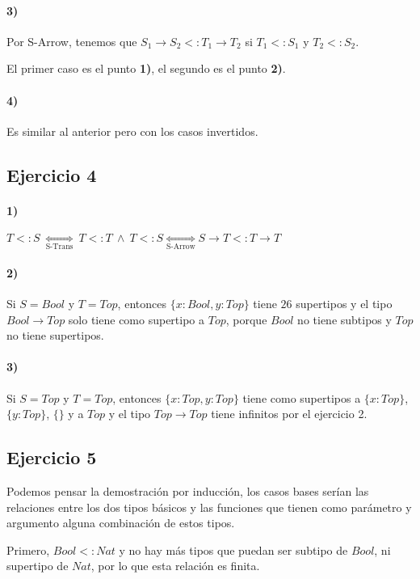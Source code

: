 \documentclass[10pt,a4paper, landscape]{article}
\begin{document}
\begin{multicols}{2}
		\paragraph{3)} Por S-Arrow, tenemos que $S_1\to S_2 <: T_1\to T_2$ si $T_1 <: S_1$ y $T_2 <: S_2$. 
		
		El primer caso es el punto \textbf{1)}, el segundo es el punto \textbf{2)}.
		\paragraph{4)} Es similar al anterior pero con los casos invertidos.
		\vfill\null
\end{multicols}

\newpage
\begin{multicols}{2}
		\subsection{Ejercicio 4}
		\paragraph{1)} $T<:S~\underset{\text{S-Trans}}{\iff} ~ T<:T~\land~T<:S \underset{\text{S-Arrow}}{\iff} S\to T <: T\to T$
		\paragraph{2)} Si $S = Bool$ y $T = Top$, entonces $\{x:Bool, y:Top\}$ tiene $26$ supertipos y el tipo $Bool\to Top$ solo tiene como supertipo a $Top$, porque $Bool$ no tiene subtipos y $Top$ no tiene supertipos.
		\paragraph{3)} Si $S = Top$ y $T = Top$, entonces $\{x:Top, y:Top\}$ tiene como supertipos a $\{x:Top\}$, $\{y:Top\}$, $\{\}$ y a $Top$ y el tipo $Top\to Top$ tiene infinitos por el ejercicio 2.
		\vfill\null
		\columnbreak
		
\subsection{Ejercicio 5}
Podemos pensar la demostración por inducción, los casos bases serían las relaciones entre los dos tipos básicos y las funciones que tienen como parámetro y argumento alguna combinación de estos tipos.

Primero, $Bool <: Nat$ y no hay más tipos que puedan ser subtipo de $Bool$, ni supertipo de $Nat$, por lo que esta relación es finita.


\end{multicols}
\end{document}
